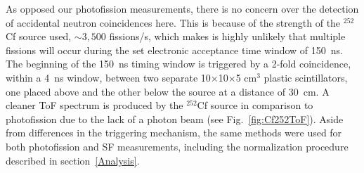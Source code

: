 As opposed our photofission measurements, there is no concern over the detection of accidental neutron coincidences here.
This is because of the strength of the $^{252}$Cf source used, $\sim 3,500$ fissions/s, which makes is highly unlikely that multiple fissions will occur during the set electronic acceptance time window of 150~ns.
The beginning of the 150~ns timing window is triggered by a 2-fold coincidence, within a 4~ns window, between two separate 10$\times$10$\times$5 cm$^3$ plastic scintillators, one placed above and the other below the source at a distance of 30~cm.
A cleaner ToF spectrum is produced by the $^{252}$Cf source in comparison to photofission due to the lack of a photon beam (see Fig.~\ref{fig:Cf252ToF}).
Aside from differences in the triggering mechanism, the same methods were used for both photofission and SF measurements, including the normalization procedure described in section~\ref{Analysis}.